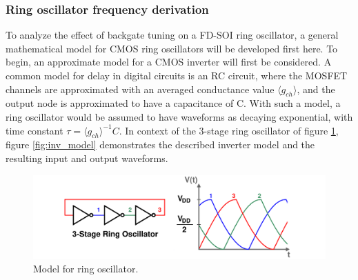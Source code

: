 	\FloatBarrier


	\subsubsection{Ring oscillator frequency derivation}
		To analyze the effect of backgate tuning on a FD-SOI ring oscillator, a general mathematical model for CMOS ring oscillators will be developed first here. To begin, an approximate model for a CMOS inverter will first be considered. A common model for delay in digital circuits is an RC circuit, where the MOSFET channels are approximated with an averaged conductance value $\langle g_{ch} \rangle$, and the output node is approximated to have a capacitance of C. With such a model, a ring oscillator would be assumed to have waveforms as decaying exponential, with time constant $\tau = \langle g_{ch} \rangle^{-1}C$. In context of the 3-stage ring oscillator of figure \ref{fig:rosc_rc}, figure \ref{fig:inv_model} demonstrates the described inverter model and the resulting input and output waveforms.

		\begin{figure}[htb!]
			\center\includegraphics[width=0.8\linewidth, angle=0]{figs/theory/osc_waves}
			\caption{Model for ring oscillator.}
			\label{fig:rosc_rc}
		\end{figure}

